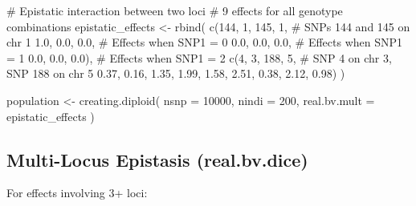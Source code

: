\documentclass[
  letterpaper,
]{book}
\newenvironment{Shaded}{\begin{snugshade}}{\end{snugshade}}
\newcommand{\AttributeTok}[1]{\textcolor[rgb]{0.40,0.45,0.13}{#1}}
\newcommand{\CommentTok}[1]{\textcolor[rgb]{0.37,0.37,0.37}{#1}}
\newcommand{\DecValTok}[1]{\textcolor[rgb]{0.68,0.00,0.00}{#1}}
\newcommand{\FloatTok}[1]{\textcolor[rgb]{0.68,0.00,0.00}{#1}}
\newcommand{\FunctionTok}[1]{\textcolor[rgb]{0.28,0.35,0.67}{#1}}
\newcommand{\NormalTok}[1]{\textcolor[rgb]{0.00,0.23,0.31}{#1}}
\newcommand{\OtherTok}[1]{\textcolor[rgb]{0.00,0.23,0.31}{#1}}
\begin{document}
\begin{Shaded}
\begin{Highlighting}[]
\CommentTok{\# Epistatic interaction between two loci}
\CommentTok{\# 9 effects for all genotype combinations}
\NormalTok{epistatic\_effects }\OtherTok{\textless{}{-}} \FunctionTok{rbind}\NormalTok{(}
  \FunctionTok{c}\NormalTok{(}\DecValTok{144}\NormalTok{, }\DecValTok{1}\NormalTok{, }\DecValTok{145}\NormalTok{, }\DecValTok{1}\NormalTok{,  }\CommentTok{\# SNPs 144 and 145 on chr 1}
    \FloatTok{1.0}\NormalTok{, }\FloatTok{0.0}\NormalTok{, }\FloatTok{0.0}\NormalTok{,   }\CommentTok{\# Effects when SNP1 = 0}
    \FloatTok{0.0}\NormalTok{, }\FloatTok{0.0}\NormalTok{, }\FloatTok{0.0}\NormalTok{,   }\CommentTok{\# Effects when SNP1 = 1}
    \FloatTok{0.0}\NormalTok{, }\FloatTok{0.0}\NormalTok{, }\FloatTok{0.0}\NormalTok{),  }\CommentTok{\# Effects when SNP1 = 2}
  \FunctionTok{c}\NormalTok{(}\DecValTok{4}\NormalTok{, }\DecValTok{3}\NormalTok{, }\DecValTok{188}\NormalTok{, }\DecValTok{5}\NormalTok{,    }\CommentTok{\# SNP 4 on chr 3, SNP 188 on chr 5}
    \FloatTok{0.37}\NormalTok{, }\FloatTok{0.16}\NormalTok{, }\FloatTok{1.35}\NormalTok{,}
    \FloatTok{1.99}\NormalTok{, }\FloatTok{1.58}\NormalTok{, }\FloatTok{2.51}\NormalTok{,}
    \FloatTok{0.38}\NormalTok{, }\FloatTok{2.12}\NormalTok{, }\FloatTok{0.98}\NormalTok{)}
\NormalTok{)}

\NormalTok{population }\OtherTok{\textless{}{-}} \FunctionTok{creating.diploid}\NormalTok{(}
  \AttributeTok{nsnp =} \DecValTok{10000}\NormalTok{,}
  \AttributeTok{nindi =} \DecValTok{200}\NormalTok{,}
  \AttributeTok{real.bv.mult =}\NormalTok{ epistatic\_effects}
\NormalTok{)}
\end{Highlighting}
\end{Shaded}

\subsection{Multi-Locus Epistasis
(real.bv.dice)}\label{multi-locus-epistasis-real.bv.dice}

For effects involving 3+ loci:
\end{document}
